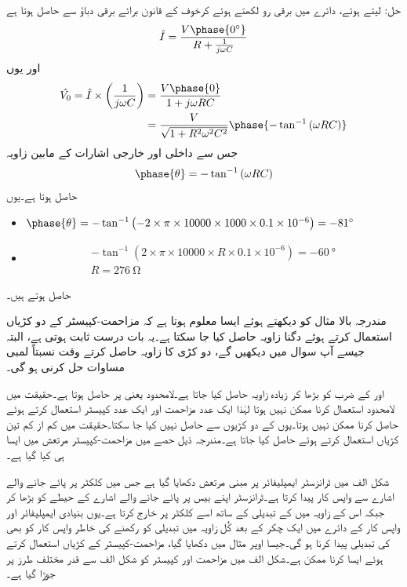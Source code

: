 حل:
 لیتے ہوئے، دائرے میں برقی رو  لکھتے ہوئے کرخوف کے قانون برائے برقی دباؤ سے حاصل ہوتا ہے
\begin{align*}
\hat{I}=\frac{V \phase{\SI{0}{\degree}}}{R+\frac{1}{j\omega C}}
\end{align*}
اور یوں
\begin{align*}
\hat{V_0}= \hat{I} \times \left(\frac{1}{j\omega C} \right)&=\frac{V\phase{0}}{1+j \omega R C}\\
&=\frac{V}{\sqrt{1+R^2 \omega^2 C^2}} \phase{-\tan^{-1} \left(\omega R C \right)}
\end{align*}
جس سے داخلی اور خارجی اشارات کے مابین زاویہ
\begin{align*}
\phase{\theta}=-\tan^{-1} \left(\omega R C \right) 
\end{align*}
حاصل ہوتا ہے۔یوں
\begin{itemize}
\item
$\phase{\theta}=-\tan^{-1} \left(-2 \times \pi \times 10000\times 1000 \times 0.1 \times 10^{-6} \right)=\SI{-81}{\degree} $
\item
\begin{align*}
-\tan^{-1}\left(2 \times \pi \times 10000 \times R \times 0.1 \times 10^{-6}\right)=\SI{-60}{\degree}\\
R=\SI{276}{\ohm}
\end{align*}
\end{itemize}
حاصل ہوتے ہیں۔

مندرجہ بالا مثال کو دیکھتے ہوئے ایسا معلوم ہوتا ہے کہ مزاحمت-کپیسٹر کے دو کڑیاں استعمال کرتے ہوئے دگنا زاویہ حاصل کیا جا سکتا ہے۔یہ بات درست ثابت ہوتی ہے، البتہ جیسے آپ سوال  میں دیکھیں گے، دو کڑی  کا زاویہ حاصل کرتے وقت نسبتاً لمبی مساوات حل کرنی ہو گی۔

 اور  کے ضرب  کو بڑھا کر زیادہ زاویہ حاصل کیا جاتا ہے۔لامحدود  یعنی پر  حاصل ہوتا ہے۔حقیقت میں لامحدود  استعمال کرنا ممکن نہیں ہوتا لہٰذا ایک عدد مزاحمت اور ایک عدد کپیسٹر استعمال کرتے ہوئے  حاصل کرنا ممکن نہیں ہوتا۔یوں  کے دو کڑیوں سے  حاصل نہیں کیا جا سکتا۔حقیقت میں کم از کم تین  کڑیاں استعمال کرتے ہوئے  حاصل کیا جاتا ہے۔مندرجہ ذیل حصے میں مزاحمت-کپیسٹر مرتعش میں ایسا ہی کیا گیا ہے۔  


شکل  الف میں ٹرانزسٹر ایمپلیفائر پر مبنی مرتعش دکھایا گیا ہے جس میں کلکٹر پر پائے جانے والے اشارے  سے واپس کار   پیدا کرتا ہے۔ٹرانزسٹر اپنے  بیس پر پائے جانے والے اشارے کے حیطے کو بڑھا کر جبکہ اس کے زاویہ میں   کے تبدیلی کے ساتھ اسے کلکٹر پر خارج کرتا ہے۔یوں بنیادی ایمپلیفائر اور واپس کار کے دائرے میں ایک چکر کے بعد کُل زاویہ میں تبدیلی کو  رکھنے کی خاطر واپس کار کو بھی  کی تبدیلی پیدا کرنا ہو گی۔جیسا اوپر مثال میں دکھایا گیا، مزاحمت-کپیسٹر  کے کڑیاں استعمال کرتے ہوئے ایسا کرنا ممکن ہے۔شکل  الف میں مزاحمت اور کپیسٹر کو  شکل  الف سے قدر مختلف طرز پر جوڑا گیا ہے۔ 

